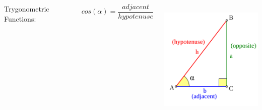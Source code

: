\documentclass[]{beamer}
\begin{document}
 \begin{frame}

   \begin{columns}[c]
      \column{2in}  %
      Trygonometric Functions:
   

   
   \begin{equation*}
   cos(\alpha) =\frac{adjacent}{hypotenuse}
   \end{equation*}
   

   
     
      \column{2.5in}
   
   
   
   
     \begin{center}
     \includegraphics[height=2.3in]{images/triangle.png}
   \end{center}
   
   
      \end{columns}

 \end{frame}
\end{document}
